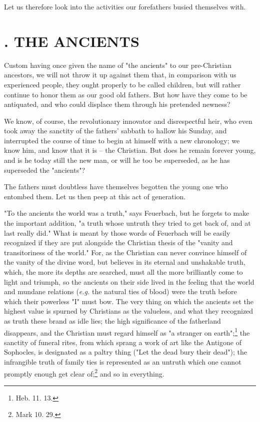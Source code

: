 \documentclass[a4paper]{book}
\begin{document}
Let us therefore look into the activities our forefathers busied themselves 
with.

\medskip{}

\section[1. The Ancients]{. THE ANCIENTS}

Custom having once given the name of "{}the ancients"{} to our pre-Christian 
ancestors, we will not throw it up against them that, in comparison with us 
experienced people, they ought properly to be called children, but will rather 
continue to honor them as our good old fathers. But how have they come to be 
antiquated, and who could displace them through his pretended newness?

We know, of course, the revolutionary innovator and disrespectful heir, who 
even took away the sanctity of the fathers' sabbath to hallow his Sunday, and 
interrupted the course of time to begin at himself with a new chronology; we 
know him, and know that it is -- the Christian. But does he remain forever 
young, and is he today still the new man, or will he too be superseded, as he 
has superseded the "{}ancients"{}?

The fathers must doubtless have themselves begotten the young one who entombed 
them. Let us then peep at this act of generation.

"{}To the ancients the world was a truth,"{} says Feuerbach, but he forgets to 
make the important addition, "{}a truth whose untruth they tried to get back 
of, and at last really did."{} What is meant by those words of Feuerbach will 
be easily recognized if they are put alongside the Christian thesis of the 
"{}vanity and transitoriness of the world."{} For, as the Christian can never 
convince himself of the vanity of the divine word, but believes in its eternal 
and unshakable truth, which, the more its depths are searched, must all the 
more brilliantly come to light and triumph, so the ancients on their side 
lived in the feeling that the world and mundane relations (\textit{e.g.} the 
natural ties of blood) were the truth before which their powerless "{}I"{} 
must bow. The very thing on which the ancients set the highest value is 
spurned by Christians as the valueless, and what they recognized as truth 
these brand as idle lies; the high significance of the fatherland disappears, 
and the Christian must regard himself as "{}a stranger on 
earth"{};\footnote{Heb. 11. 13.} the sanctity of funeral rites, from which 
sprang a work of art like the Antigone of Sophocles, is designated as a paltry 
thing ("{}Let the dead bury their dead"{}); the infrangible truth of family 
ties is represented as an untruth which one cannot promptly enough get clear 
of;\footnote{Mark 10. 29.} and so in everything.
\end{document}
